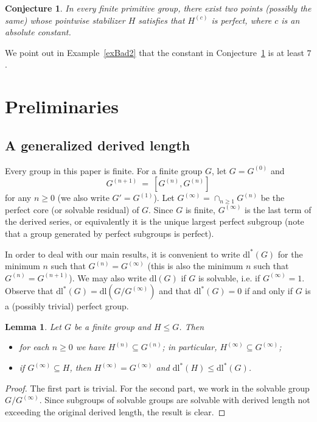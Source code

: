 \documentclass[11pt]{amsart}
\numberwithin{equation}{section}
\newtheorem{lemma}[theorem]{Lemma}
\newtheorem{conjecture}[theorem]{Conjecture}
\theoremstyle{definition}
\theoremstyle{remark}
\newcommand{\dll}{\mathrm{dl^*}}
\newcommand{\dl}{\mathrm{dl}}
\begin{document}
\begin{conjecture} \label{conjTwoPoints}
In every finite primitive group,
there exist two points (possibly the same) whose pointwise stabilizer $H$ satisfies that $H^{(c)}$ is perfect,
where $c$ is an absolute constant.
\end{conjecture} 

We point out in Example~\ref{exBad2} that the constant in Conjecture~\ref{conjTwoPoints} is at least $7$.









\vspace{0.1cm} 
\section{Preliminaries} \label{sec2}

\subsection{A generalized derived length} 

Every group in this paper is finite.
For a finite group $G$,
let $G=G^{(0)}$ and
$$ G^{(n+1)} \> = \> [G^{(n)},G^{(n)}] $$
for any $n \geq 0$
(we also write $G'=G^{(1)}$).
Let $G^{(\infty)} = \cap_{n \geq 1} G^{(n)}$ be the perfect core (or solvable residual) of $G$.
Since $G$ is finite, $G^{(\infty)}$ is the last term of the derived series, or equivalently it is the unique largest perfect subgroup
(note that a group generated by perfect subgroups is perfect).

In order to deal with our main results, it is convenient to write $\dll(G)$ for the minimum $n$ such that $G^{(n)}=G^{(\infty)}$ (this is also the minimum $n$ such that $G^{(n)} = G^{(n+1)}$).
We may also write $\dl(G)$ if $G$ is solvable, i.e. if $G^{(\infty)} =1$.
Observe that $\dll(G) = \dl(G/G^{(\infty)})$ and that $\dll(G) =0$ if and only if $G$ is a (possibly trivial) perfect group.

\begin{lemma} \label{lemSub} 
    Let $G$ be a finite group and $H \leqslant G$.
    Then
    \begin{itemize}
        \item for each $n \geq 0$ we have $H^{(n)} \subseteq G^{(n)}$;
        in particular, $H^{(\infty)} \subseteq G^{(\infty)}$;
        \item if $G^{(\infty)} \subseteq H$, then $H^{(\infty)} = G^{(\infty)}$ and $\dll(H) \leq \dll(G)$.
    \end{itemize} 
\end{lemma}
\begin{proof}
    The first part is trivial.
    For the second part, we work in the solvable group $G/G^{(\infty)}$. Since subgroups of solvable groups are solvable with derived length not exceeding the original derived length, the result is clear.
\end{proof}
\end{document}
